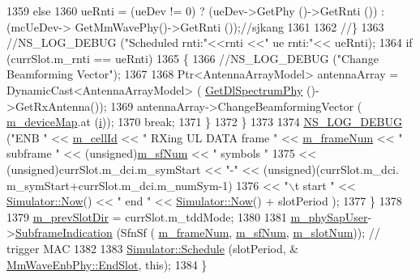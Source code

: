 \begin{DoxyCode}
1359                                 \textcolor{keywordflow}{else}
1360                                         ueRnti = (ueDev != 0) ? (ueDev->GetPhy ()->GetRnti ()) : (mcUeDev->
      GetMmWavePhy()->GetRnti ());\textcolor{comment}{//sjkang}
1361 
1362                         \textcolor{comment}{//\}}
1363                         \textcolor{comment}{//NS\_LOG\_DEBUG ("Scheduled rnti:"<<rnti <<" ue rnti:"<< ueRnti);}
1364                         \textcolor{keywordflow}{if} (currSlot.m\_rnti == ueRnti)
1365                         \{
1366                                 \textcolor{comment}{//NS\_LOG\_DEBUG ("Change Beamforming Vector");}
1367 
1368                                 Ptr<AntennaArrayModel> antennaArray = DynamicCast<AntennaArrayModel> (
      \hyperlink{classns3_1_1MmWaveEnbPhy_a1fd12ed3e1da54288cf17a1bb9bcdf74}{GetDlSpectrumPhy} ()->GetRxAntenna());
1369                                 antennaArray->ChangeBeamformingVector (
      \hyperlink{classns3_1_1MmWaveEnbPhy_a4b6fe922f96dd05597a1fe2f9a523ce9}{m\_deviceMap}.at (\hyperlink{bernuolliDistribution_8m_a6f6ccfcf58b31cb6412107d9d5281426}{i}));
1370                                 \textcolor{keywordflow}{break};
1371                         \}
1372                 \}
1373 
1374                 \hyperlink{group__logging_ga413f1886406d49f59a6a0a89b77b4d0a}{NS\_LOG\_DEBUG} (\textcolor{stringliteral}{"ENB "} << \hyperlink{classns3_1_1MmWavePhy_a0594531da45f93220d4f5de292bae823}{m\_cellId} << \textcolor{stringliteral}{" RXing UL DATA frame "} << 
      \hyperlink{classns3_1_1MmWavePhy_a852ce585035a1c12122d2775e64ff38a}{m\_frameNum} << \textcolor{stringliteral}{" subframe "} << (\textcolor{keywordtype}{unsigned})\hyperlink{classns3_1_1MmWavePhy_af3d76eb9f3e5e1ff669852d05986c1a3}{m\_sfNum} << \textcolor{stringliteral}{" symbols "}
1375                               << (\textcolor{keywordtype}{unsigned})currSlot.m\_dci.m\_symStart << \textcolor{stringliteral}{"-"} << (\textcolor{keywordtype}{unsigned})(currSlot.m\_dci.
      m\_symStart+currSlot.m\_dci.m\_numSym-1)
1376                               << \textcolor{stringliteral}{"\(\backslash\)t start "} << \hyperlink{classns3_1_1Simulator_ac3178fa975b419f7875e7105be122800}{Simulator::Now}() << \textcolor{stringliteral}{" end "} << 
      \hyperlink{classns3_1_1Simulator_ac3178fa975b419f7875e7105be122800}{Simulator::Now}() + slotPeriod );
1377         \}
1378 
1379   \hyperlink{classns3_1_1MmWaveEnbPhy_a92d3298da69cf554e4bd1ed5dbf37a08}{m\_prevSlotDir} = currSlot.m\_tddMode;
1380 
1381         \hyperlink{classns3_1_1MmWaveEnbPhy_a666331e7a8200a6b17215bdda089f671}{m\_phySapUser}->\hyperlink{classns3_1_1MmWaveEnbPhySapUser_a233023a30b3f41bc54347d3bdce1ff05}{SubframeIndication} (SfnSf (
      \hyperlink{classns3_1_1MmWavePhy_a852ce585035a1c12122d2775e64ff38a}{m\_frameNum}, \hyperlink{classns3_1_1MmWavePhy_af3d76eb9f3e5e1ff669852d05986c1a3}{m\_sfNum}, \hyperlink{classns3_1_1MmWavePhy_a6c83cdb8c36a9a58ae8b9f17933680ac}{m\_slotNum}));  \textcolor{comment}{// trigger MAC}
1382 
1383         \hyperlink{classns3_1_1Simulator_a671882c894a08af4a5e91181bf1eec13}{Simulator::Schedule} (slotPeriod, &
      \hyperlink{classns3_1_1MmWaveEnbPhy_aaea005a7298f69167a554a3c3c03b132}{MmWaveEnbPhy::EndSlot}, \textcolor{keyword}{this});
1384 \}
\end{DoxyCode}


